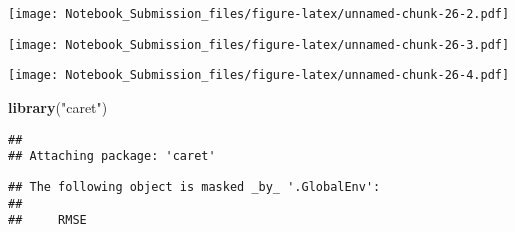 \documentclass[
]{article}
\newenvironment{Shaded}{\begin{snugshade}}{\end{snugshade}}
\newcommand{\DataTypeTok}[1]{\textcolor[rgb]{0.13,0.29,0.53}{#1}}
\newcommand{\DecValTok}[1]{\textcolor[rgb]{0.00,0.00,0.81}{#1}}
\newcommand{\KeywordTok}[1]{\textcolor[rgb]{0.13,0.29,0.53}{\textbf{#1}}}
\newcommand{\NormalTok}[1]{#1}
\newcommand{\OperatorTok}[1]{\textcolor[rgb]{0.81,0.36,0.00}{\textbf{#1}}}
\newcommand{\OtherTok}[1]{\textcolor[rgb]{0.56,0.35,0.01}{#1}}
\newcommand{\StringTok}[1]{\textcolor[rgb]{0.31,0.60,0.02}{#1}}
\begin{document}
\texttt{[image: Notebook\_Submission\_files/figure-latex/unnamed-chunk-26-2.pdf]}

\begin{Shaded}
\end{Shaded}

\texttt{[image: Notebook\_Submission\_files/figure-latex/unnamed-chunk-26-3.pdf]}

\begin{Shaded}
\end{Shaded}

\texttt{[image: Notebook\_Submission\_files/figure-latex/unnamed-chunk-26-4.pdf]}

\begin{Shaded}
\begin{Highlighting}[]
\KeywordTok{library}\NormalTok{(}\StringTok{"caret"}\NormalTok{)}
\end{Highlighting}
\end{Shaded}

\begin{verbatim}
## 
## Attaching package: 'caret'
\end{verbatim}

\begin{verbatim}
## The following object is masked _by_ '.GlobalEnv':
## 
##     RMSE
\end{verbatim}

\begin{Shaded}
\end{Shaded}
\end{document}
